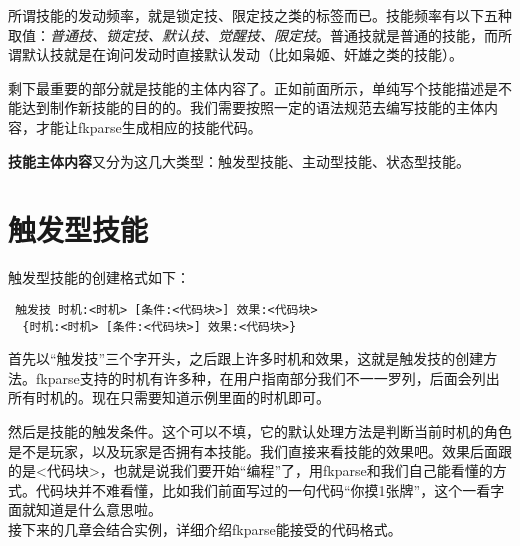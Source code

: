 所谓技能的发动频率，就是锁定技、限定技之类的标签而已。技能频率有以下五种取值：\emph{普通技、锁定技、默认技、觉醒技、限定技}。普通技就是普通的技能，而所谓默认技就是在询问发动时直接默认发动（比如枭姬、奸雄之类的技能）。

剩下最重要的部分就是技能的主体内容了。正如前面所示，单纯写个技能描述是不能达到制作新技能的目的的。我们需要按照一定的语法规范去编写技能的主体内容，才能让fkparse生成相应的技能代码。

\textbf{技能主体内容}又分为这几大类型：触发型技能、主动型技能、状态型技能。

\section{触发型技能}

触发型技能的创建格式如下：

\begin{verbatim}
 触发技 时机:<时机> [条件:<代码块>] 效果:<代码块>
  {时机:<时机> [条件:<代码块>] 效果:<代码块>}
\end{verbatim}

首先以“触发技”三个字开头，之后跟上许多时机和效果，这就是触发技的创建方法。fkparse支持的时机有许多种，在用户指南部分我们不一一罗列，后面会列出所有时机的。现在只需要知道示例里面的时机即可。

然后是技能的触发条件。这个可以不填，它的默认处理方法是判断当前时机的角色是不是玩家，以及玩家是否拥有本技能。我们直接来看技能的效果吧。效果后面跟的是<代码块>，也就是说我们要开始“编程”了，用fkparse和我们自己能看懂的方式。代码块并不难看懂，比如我们前面写过的一句代码“你摸1张牌”，这个一看字面就知道是什么意思啦。\\

接下来的几章会结合实例，详细介绍fkparse能接受的代码格式。
